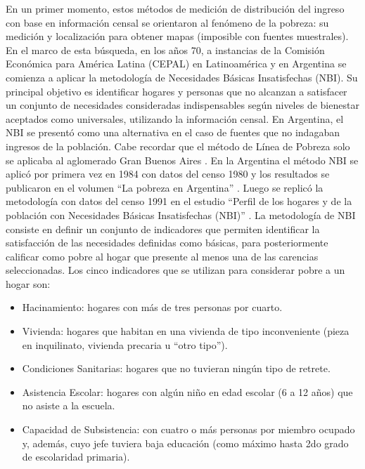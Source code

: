 En un primer momento, estos métodos de medición de distribución del ingreso con base en información censal se orientaron al fenómeno de la pobreza: su medición y localización para obtener mapas (imposible con fuentes muestrales). En el marco de esta búsqueda, en los años 70, a instancias de la Comisión Económica para América Latina (CEPAL) en Latinoamérica y en Argentina se comienza a aplicar la metodología de Necesidades Básicas Insatisfechas (NBI). Su principal objetivo es identificar hogares y personas que no alcanzan a satisfacer un conjunto de necesidades consideradas indispensables según niveles de bienestar aceptados como universales, utilizando la información censal. 
En Argentina, el NBI se presentó como una alternativa en el caso de fuentes que no indagaban ingresos de la población. Cabe recordar que el método de Línea de Pobreza solo se aplicaba al aglomerado Gran Buenos Aires \cite{indec1984}. En la Argentina el método NBI se aplicó por primera vez en 1984 con datos del censo 1980 y los resultados se publicaron en el volumen “La pobreza en Argentina” \cite{indec1984}. Luego se replicó la metodología con datos del censo 1991 en el estudio “Perfil de los hogares y de la población con Necesidades Básicas Insatisfechas (NBI)” \cite{indec1996}.
La metodología de NBI \cite{beccaria,indec2000a,indec2000b} consiste en definir un conjunto de indicadores que permiten identificar la satisfacción de las necesidades definidas como básicas, para posteriormente calificar como pobre al hogar que presente al menos una de las carencias seleccionadas. Los cinco indicadores que se utilizan para considerar pobre a un hogar son:

\begin{itemize}
	\item Hacinamiento: hogares con más de tres personas por cuarto.
	\item Vivienda: hogares que habitan en una vivienda de tipo inconveniente (pieza en inquilinato, vivienda precaria u “otro tipo”).
	\item Condiciones Sanitarias: hogares que no tuvieran ningún tipo de retrete.
	\item Asistencia Escolar: hogares con algún niño en edad escolar (6 a 12 años) que no asiste a la escuela.
	\item Capacidad de Subsistencia: con cuatro o más personas por miembro ocupado y, además, cuyo jefe tuviera baja educación (como máximo hasta 2do grado de escolaridad primaria).
\end{itemize}

